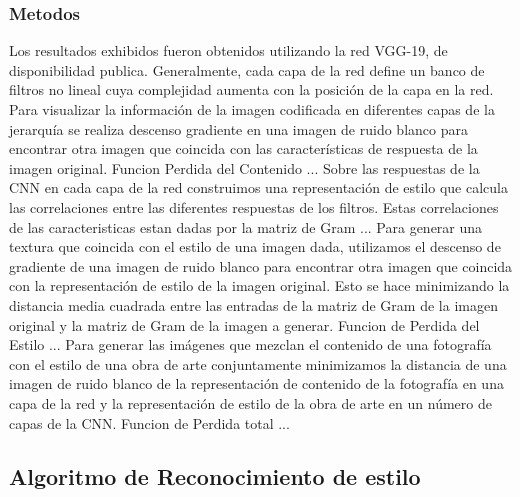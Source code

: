 \documentclass[a4paper,10pt]{article}
\begin{document}
    \subsubsection{Metodos}
      Los resultados exhibidos fueron obtenidos utilizando la red VGG-19, de disponibilidad publica.
      Generalmente, cada capa de la red define un banco de filtros no lineal cuya complejidad aumenta con la posición de la capa en la red.
      Para visualizar la información de la imagen codificada en diferentes capas de la jerarquía se realiza descenso gradiente en una imagen de ruido blanco 
      para encontrar otra imagen que coincida con las características de respuesta de la imagen original.
      Funcion Perdida del Contenido ...
      Sobre las respuestas de la CNN en cada capa de la red construimos una representación de estilo que calcula las correlaciones entre las diferentes respuestas de los filtros.
      Estas correlaciones de las caracteristicas estan dadas por la matriz de Gram ...
      Para generar una textura que coincida con el estilo de una imagen dada, utilizamos el descenso de gradiente de una imagen de ruido blanco para encontrar otra imagen que coincida 
      con la representación de estilo de la imagen original. Esto se hace minimizando la distancia media cuadrada entre las entradas de la matriz de Gram de la imagen 
      original y la matriz de Gram de la imagen a generar.
      Funcion de Perdida del Estilo ...
      Para generar las imágenes que mezclan el contenido de una fotografía con el estilo de una obra de arte conjuntamente minimizamos la distancia de una imagen de ruido blanco 
      de la representación de contenido de la fotografía en una capa de la red y la representación de estilo de la obra de arte en un número de capas de la CNN.
      Funcion de Perdida total ...
    
  \subsection{Algoritmo de Reconocimiento de estilo}
\end{document}
